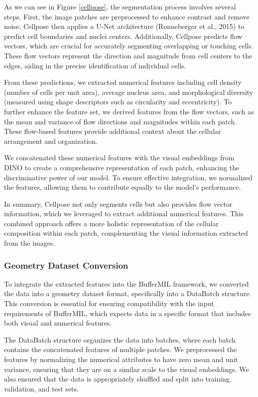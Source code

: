\documentclass[10pt,twocolumn]{article}
\begin{document}
As we can see in Figure \ref{cellpose}, the segmentation process involves several steps. First, the image patches are preprocessed to enhance contrast and remove noise. Cellpose then applies a U-Net architecture (Ronneberger et al., 2015)\cite{ronneberger2015unetconvolutionalnetworksbiomedical} to predict cell boundaries and nuclei centers. Additionally, Cellpose predicts flow vectors, which are crucial for accurately segmenting overlapping or touching cells. These flow vectors represent the direction and magnitude from cell centers to the edges, aiding in the precise identification of individual cells.

From these predictions, we extracted numerical features including cell density (number of cells per unit area), average nucleus area, and morphological diversity (measured using shape descriptors such as circularity and eccentricity). To further enhance the feature set, we derived features from the flow vectors, such as the mean and variance of flow directions and magnitudes within each patch. These flow-based features provide additional context about the cellular arrangement and organization.

We concatenated these numerical features with the visual embeddings from DINO to create a comprehensive representation of each patch, enhancing the discriminative power of our model. To ensure effective integration, we normalized the features, allowing them to contribute equally to the model's performance.

In summary, Cellpose not only segments cells but also provides flow vector information, which we leveraged to extract additional numerical features. This combined approach offers a more holistic representation of the cellular composition within each patch, complementing the visual information extracted from the images.

\subsubsection{Geometry Dataset Conversion}

To integrate the extracted features into the BufferMIL framework, we converted the data into a geometry dataset format, specifically into a DataBatch structure. This conversion is essential for ensuring compatibility with the input requirements of BufferMIL, which expects data in a specific format that includes both visual and numerical features.

The DataBatch structure organizes the data into batches, where each batch contains the concatenated features of multiple patches. We preprocessed the features by normalizing the numerical attributes to have zero mean and unit variance, ensuring that they are on a similar scale to the visual embeddings. We also ensured that the data is appropriately shuffled and split into training, validation, and test sets.
\end{document}
